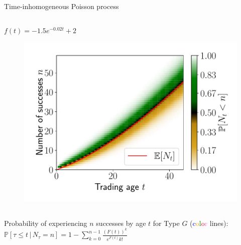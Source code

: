 \documentclass{beamer}
\begin{document}
\begin{frame}[allowframebreaks]{Time-inhomogeneous Poisson process}
\begin{columns}[t]
		\begin{column}{0.49\textwidth}
			\begin{block}{$f(t)=-1.5e^{-0.02t}+2$}
				\begin{figure}
					\includegraphics[width=\linewidth]{figures/probn1}
				\end{figure}
			\end{block}
		\end{column}
	\end{columns}

\framebreak

Probability of experiencing $n$ successes by age $t$ for Type $G$
(\textcolor{blue}{c}\textcolor{orange}{o}\textcolor{green}{l}\textcolor{red}{o}\textcolor{violet}{r} lines):
$
\mathbb{P}[\tau \leq t \,|\, N_{\tau} = n]
= 1 - \sum_{k=0}^{n-1} \frac{\left(F(t)\right)^k}{e^{F(t)}k!}
$


\end{frame}
\end{document}
